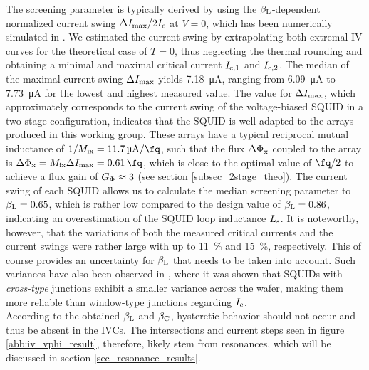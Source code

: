 The screening parameter is typically derived by using the $\beta_{\rm L}$-dependent normalized current swing $\Delta I_{\rm max}/2I_{\rm c}$ at $V=0$, which has been numerically simulated in \cite{Tesche1977}. We estimated the current swing by extrapolating both extremal IV curves for the theoretical case of $T=0$, thus neglecting the thermal rounding and obtaining a minimal and maximal critical current $I_{\rm c,1}$ and $I_{\rm c,2}$. %
The median of the maximal current swing $\Delta I_{\rm max}$ yields \qty{7.18}{\micro\ampere}, ranging from \qty{6.09}{\micro\ampere} to \qty{7.73}{\micro\ampere} for the lowest and highest measured value. The value for $\Delta I_{\rm max}$, which approximately corresponds to the current swing of the voltage-biased SQUID in a two-stage configuration, indicates that the SQUID is well adapted to the arrays produced in this working group. These arrays have a typical reciprocal mutual inductance of $1/M_{\rm ix}=\qty{11.7}{\micro\ampere\per\fq}$, such that the flux $\Delta\Phi_{\rm x}$ coupled to the array is $\Delta\Phi_{\rm x}=M_{\rm ix}\Delta I_{\rm max}=\qty{0.61}{\fq}$, which is close to the optimal value of $\unit{\fq}/2$ to achieve a flux gain of $G_{\rm \Phi}\approx 3$ (see section \ref{subsec_2stage_theo}). The current swing of each SQUID allows us to calculate the median screening parameter to $\beta_{\rm L}=0.65$, which is rather low compared to the design value of $\beta_{\rm L}=0.86$, indicating an overestimation of the SQUID loop inductance $L_{\rm s}$. 
It is noteworthy, however, that the variations of both the measured critical currents and the current swings were rather large with up to \qty{11}{\percent} and \qty{15}{\percent}, respectively. This of course provides an uncertainty for $\beta_{\rm L}$ that needs to be taken into account. Such variances have also been observed in \cite{Bauer2022}, where it was shown that SQUIDs with \textit{cross-type} junctions exhibit a smaller variance across the wafer, making them more reliable than window-type junctions regarding $I_{\rm c}$. \\
According to the obtained $\beta_{\rm L}$ and $\beta_{\rm C}$, hysteretic behavior should not occur and thus be absent in the IVCs. The intersections and current steps seen in figure \ref{abb:iv_vphi_result}, therefore, likely stem from resonances, which will be discussed in section \ref{sec_resonance_results}.

